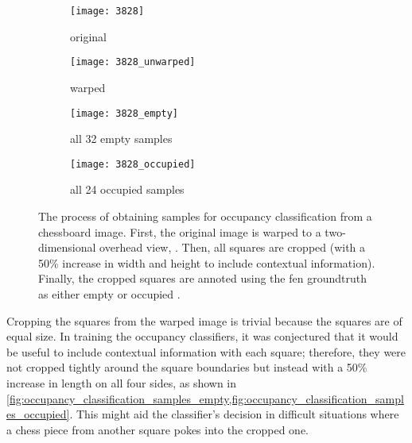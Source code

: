\documentclass[../main.tex]{subfiles}
\begin{document}
\begin{figure}
    \centering
    \begin{subfigure}[b]{0.47\textwidth}
        \centering
        \texttt{[image: 3828]}
        \caption{original}
        \label{fig:occupancy_classification_samples_original}
    \end{subfigure}
    \hfill
    \begin{subfigure}[b]{0.47\textwidth}
        \centering
        \texttt{[image: 3828\_unwarped]}
        \caption{warped}
        \label{fig:occupancy_classification_samples_warped}
    \end{subfigure}
    
    \bigskip
    \begin{subfigure}[b]{0.47\textwidth}
        \centering
        \texttt{[image: 3828\_empty]}
        \caption{all 32 empty samples}
        \label{fig:occupancy_classification_samples_empty}
    \end{subfigure}
    \hfill
    \begin{subfigure}[b]{0.47\textwidth}
        \centering
        \texttt{[image: 3828\_occupied]}
        \caption{all 24 occupied samples}
        \label{fig:occupancy_classification_samples_occupied}
    \end{subfigure}
    \caption[The process of obtaining samples for occupancy classification from a chessboard image.]{The process of obtaining samples for occupancy classification from a chessboard image. First, the original image  is warped to a two-dimensional overhead view, . Then, all squares are cropped (with a 50\% increase in width and height to include contextual information). Finally, the cropped squares are annoted using the \gls{fen} groundtruth as either empty  or occupied .}
    \label{fig:occupancy_classification_samples}
\end{figure}

Cropping the squares from the warped image is trivial because the squares are of equal size.
In training the occupancy classifiers, it was conjectured that it would be useful to include contextual information with each square; therefore, they were not cropped tightly around the square boundaries but instead with a 50\% increase in length on all four sides, as shown in \cref{fig:occupancy_classification_samples_empty,fig:occupancy_classification_samples_occupied}.
This might aid the classifier's decision in difficult situations where a chess piece from another square pokes into the cropped one.
\end{document}
